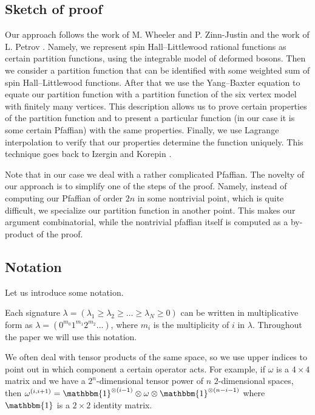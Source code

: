 \documentclass[ALCO,Unicode]{cedram}
\begin{document}
\subsection{Sketch of proof}
Our approach follows the work of M. Wheeler and P. Zinn-Justin \cite{WZJ16} and the work of L. Petrov \cite{Pet21}. Namely, we represent spin Hall--Littlewood rational functions as certain partition functions, using the integrable model of deformed bosons. 
Then we consider a partition function that can be identified with some weighted sum of spin Hall--Littlewood functions. After that we use the Yang--Baxter equation to equate our partition function with a partition function of the six vertex model with finitely many vertices. This description allows us to prove certain properties of the partition function and to present a particular function (in our case it is some certain Pfaffian) with the same properties.
Finally, we use Lagrange interpolation to verify that our properties determine the function uniquely. This technique goes back to Izergin and Korepin \cite{Ize87,KBI93}.

Note that in our case we deal with a rather complicated Pfaffian. The novelty of our approach is to simplify one of the steps of the proof. Namely, instead of computing our Pfaffian of order $2n$ in some nontrivial point, which is quite difficult, we specialize our partition function in another point. This makes our argument combinatorial, while the nontrivial pfaffian itself is computed as a by-product of the proof.


\subsection{Notation}
\label{sec:not}

Let us introduce some notation.

Each signature $\lambda=(\lambda_1\ge \lambda_2\ge \ldots\ge \lambda_N\ge0 )$ can be written in multiplicative form as $\lambda=(0^{m_0} 1^{m_1} 2^{m_2} \dots)$, where $m_i$ is the multiplicity of $i$ in $\lambda$. Throughout the paper we will use this notation.

We often deal with tensor products of the same space, so we use upper indices to point out in which component a certain operator acts. For example, if $\omega$ is a  $4\times4$ matrix and we have a $2^n$-dimensional tensor power of $n$ $2$-dimensional spaces, then $\omega^{(i, {i+1})}= \mathbbm{1}^{\otimes ({i - 1})} \otimes \omega \otimes \mathbbm{1}^{\otimes ({n - i - 1})}$ where $\mathbbm{1}$  is a $2\times2$ identity matrix.
\end{document}
